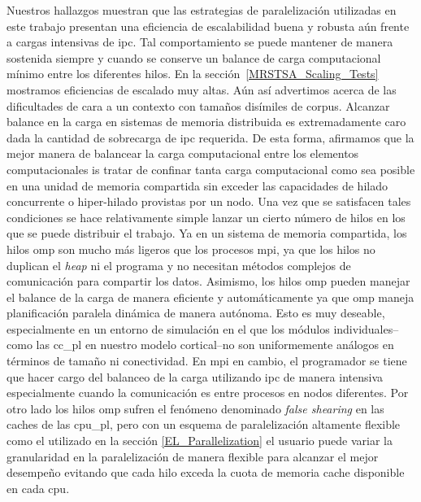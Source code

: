 Nuestros hallazgos muestran que las estrategias de paralelización utilizadas en este trabajo presentan una eficiencia de escalabilidad buena y robusta aún frente a cargas intensivas de \gls{ipc}.
Tal comportamiento se puede mantener de manera sostenida siempre y cuando se conserve un balance de carga computacional mínimo entre los diferentes hilos.
En la sección~\ref{MRSTSA_Scaling_Tests} mostramos eficiencias de escalado muy altas.
Aún así advertimos acerca de las dificultades de cara a un contexto con tamaños disímiles de corpus.
Alcanzar balance en la carga en sistemas de memoria distribuida es extremadamente caro dada la cantidad de sobrecarga de \gls{ipc} requerida.
De esta forma, afirmamos que la mejor manera de balancear la carga computacional entre los elementos computacionales is tratar de confinar tanta carga computacional como sea posible en una unidad de memoria compartida sin exceder las capacidades de hilado concurrente o hiper-hilado provistas por un nodo.
Una vez que se satisfacen tales condiciones se hace relativamente simple lanzar un cierto número de hilos en los que se puede distribuir el trabajo.
Ya en un sistema de memoria compartida, los hilos \gls{omp} son mucho más ligeros que los procesos \gls{mpi}, ya que los hilos no duplican el \emph{heap} ni el programa y no necesitan métodos complejos de comunicación para compartir los datos.
Asimismo, los hilos \gls{omp} pueden manejar el balance de la carga de manera eficiente y automáticamente ya que \gls{omp} maneja planificación paralela dinámica de manera autónoma.
Esto es muy deseable, especialmente en un entorno de simulación en el que los módulos individuales--como las \gls{cc_pl} en nuestro modelo cortical--no son uniformemente análogos en términos de tamaño ni conectividad.
En \gls{mpi} en cambio, el programador se tiene que hacer cargo del balanceo de la carga utilizando \gls{ipc} de manera intensiva especialmente cuando la comunicación es entre procesos en nodos diferentes.
Por otro lado los hilos \gls{omp} sufren el fenómeno denominado \emph{false shearing} en las caches de las \gls{cpu_pl}, pero con un esquema de paralelización altamente flexible como el utilizado en la sección \ref{EL_Parallelization} el usuario puede variar la granularidad en la paralelización de manera flexible para alcanzar el mejor desempeño evitando que cada hilo exceda la cuota de memoria cache disponible en cada \gls{cpu}.

